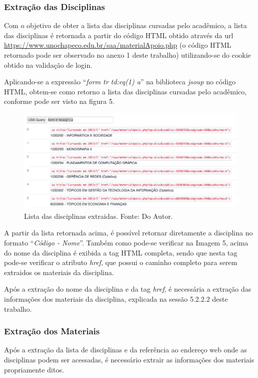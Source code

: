 \subsubsection{Extração das Disciplinas}
Com o objetivo de obter a lista das disciplinas cursadas pelo acadêmico, a lista das disciplinas é retornada a partir do código HTML obtido através da url \url{https://www.unochapeco.edu.br/saa/materialApoio.php} (o código HTML retornado pode ser observado no anexo 1 deste trabalho) utilizando-se do cookie obtido na validação de login.

Aplicando-se a expressão ``\emph{form tr td:eq(1) a}'' na biblioteca \emph{jsoup} no código HTML, obtem-se como retorno a lista das disciplinas cursadas pelo acadêmico, conforme pode ser visto na figura 5.

\begin{figure}[!htb]
     \centering
     \includegraphics[scale=0.5]{imagens/listadisciplinasmaterialapoio.png}
     \caption[Extração de Informações - Lista de Disciplinas do Material de Apoio]{Lista das disciplinas extraidas. Fonte: Do Autor.}
\end{figure}

A partir da lista retornada acima, é possível retornar diretamente a disciplina no formato ``\emph{Código - Nome}''. Também como pode-se verificar na Imagem 5, acima do nome da disciplina é exibida a tag HTML completa, sendo que nesta tag pode-se verificar o atributo \emph{href}, que possui o caminho completo para serem extraidos os materiais da disciplina.

Após a extração do nome da disciplina e da tag \emph{href}, é necessária a extração das informações dos materiais da disciplina, explicada na sessão 5.2.2.2 deste trabalho.

\subsubsection{Extração dos Materiais}
Após a extração da lista de disciplinas e da referência ao endereço web onde as disciplinas podem ser acessadas, é necessário extrair as informações dos materiais propriamente ditos.

